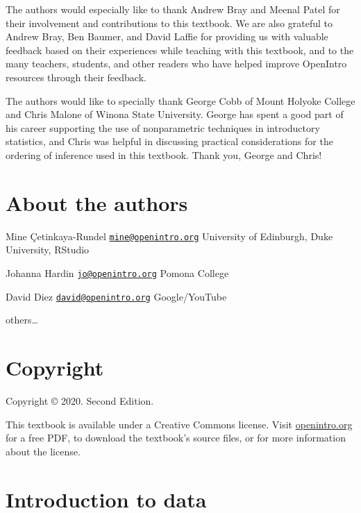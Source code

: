 \documentclass[]{book}
\begin{document}
The authors would especially like to thank Andrew Bray and Meenal Patel for their involvement and contributions to this textbook. We are also grateful to Andrew Bray, Ben Baumer, and David Laffie for providing us with valuable feedback based on their experiences while teaching with this textbook, and to the many teachers, students, and other readers who have helped improve OpenIntro resources through their feedback.

The authors would like to specially thank George Cobb of Mount Holyoke College and Chris Malone of Winona State University. George has spent a good part of his career supporting the use of nonparametric techniques in introductory statistics, and Chris was helpful in discussing practical considerations for the ordering of inference used in this textbook. Thank you, George and Chris!

\hypertarget{about-the-authors}{%
\chapter*{About the authors}\label{about-the-authors}}

Mine Çetinkaya-Rundel
\href{mailto:mine@openintro.org}{\nolinkurl{mine@openintro.org}}
University of Edinburgh, Duke University, RStudio

Johanna Hardin
\href{mailto:jo@openintro.org}{\nolinkurl{jo@openintro.org}}
Pomona College

David Diez
\href{mailto:david@openintro.org}{\nolinkurl{david@openintro.org}}
Google/YouTube

others\ldots{}

\hypertarget{copyright}{%
\chapter*{Copyright}\label{copyright}}

Copyright © 2020. Second Edition.

This textbook is available under a Creative Commons license. Visit \href{https://www.openintro.org/book/isrs/}{openintro.org} for a free PDF, to download the textbook's source files, or for more information about the license.

\hypertarget{intro-to-data}{%
\chapter{Introduction to data}\label{intro-to-data}}
\end{document}
